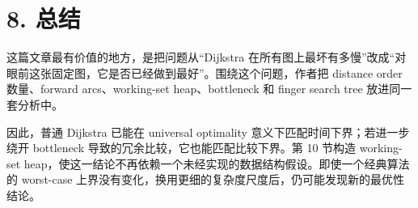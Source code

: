 \section*{8. 总结}
这篇文章最有价值的地方，是把问题从“Dijkstra 在所有图上最坏有多慢”改成“对眼前这张固定图，它是否已经做到最好”。围绕这个问题，作者把 distance order 数量、forward arcs、working-set heap、bottleneck 和 finger search tree 放进同一套分析中。

因此，普通 Dijkstra 已能在 universal optimality 意义下匹配时间下界；若进一步绕开 bottleneck 导致的冗余比较，它也能匹配比较下界。第 10 节构造 working-set heap，使这一结论不再依赖一个未经实现的数据结构假设。即使一个经典算法的 worst-case 上界没有变化，换用更细的复杂度尺度后，仍可能发现新的最优性结论。

